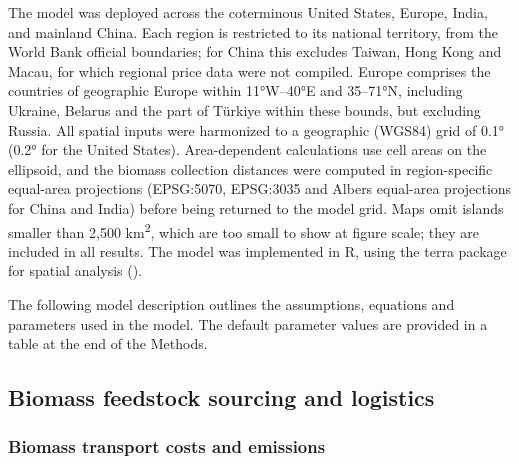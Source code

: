 \documentclass[
  letterpaper,
]{article}
\begin{document}
The model was deployed across the coterminous United States, Europe,
India, and mainland China. Each region is restricted to its national
territory, from the World Bank official boundaries; for China this
excludes Taiwan, Hong Kong and Macau, for which regional price data were
not compiled. Europe comprises the countries of geographic Europe within
11°W--40°E and 35--71°N, including Ukraine, Belarus and the part of
Türkiye within these bounds, but excluding Russia. All spatial inputs
were harmonized to a geographic (WGS84) grid of 0.1° (0.2° for the
United States). Area-dependent calculations use cell areas on the
ellipsoid, and the biomass collection distances were computed in
region-specific equal-area projections (EPSG:5070, EPSG:3035 and Albers
equal-area projections for China and India) before being returned to the
model grid. Maps omit islands smaller than 2,500 km\textsuperscript{2},
which are too small to show at figure scale; they are included in all
results. The model was implemented in R, using the terra package for
spatial analysis ().

The following model description outlines the assumptions, equations and
parameters used in the model. The default parameter values are provided
in a table at the end of the Methods.

\subsection{Biomass feedstock sourcing and
logistics}\label{biomass-feedstock-sourcing-and-logistics}

\subsubsection{Biomass transport costs and
emissions}\label{biomass-transport-costs-and-emissions}
\end{document}
